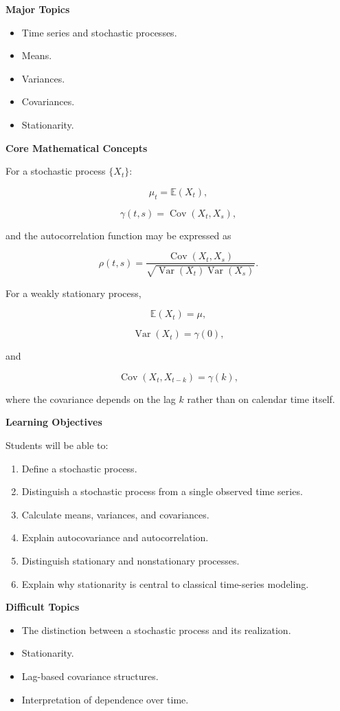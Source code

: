 \documentclass[11pt,a4paper]{article}
\newcommand{\E}{\mathbb{E}}
\newcommand{\Var}{\operatorname{Var}}
\newcommand{\Cov}{\operatorname{Cov}}
\begin{document}
\textbf{Major Topics}

\begin{itemize}
    \item Time series and stochastic processes.
    \item Means.
    \item Variances.
    \item Covariances.
    \item Stationarity.
\end{itemize}

\textbf{Core Mathematical Concepts}

For a stochastic process $\{X_t\}$:

\[
\mu_t = \E(X_t),
\]

\[
\gamma(t,s)
=
\Cov(X_t,X_s),
\]

and the autocorrelation function may be expressed as

\[
\rho(t,s)
=
\frac{\Cov(X_t,X_s)}
{\sqrt{\Var(X_t)\Var(X_s)}}.
\]

For a weakly stationary process,

\[
\E(X_t)=\mu,
\]

\[
\Var(X_t)=\gamma(0),
\]

and

\[
\Cov(X_t,X_{t-k})=\gamma(k),
\]

where the covariance depends on the lag $k$ rather than on calendar time
itself.

\textbf{Learning Objectives}

Students will be able to:

\begin{enumerate}
    \item Define a stochastic process.
    \item Distinguish a stochastic process from a single observed time series.
    \item Calculate means, variances, and covariances.
    \item Explain autocovariance and autocorrelation.
    \item Distinguish stationary and nonstationary processes.
    \item Explain why stationarity is central to classical time-series modeling.
\end{enumerate}

\textbf{Difficult Topics}

\begin{itemize}
    \item The distinction between a stochastic process and its realization.
    \item Stationarity.
    \item Lag-based covariance structures.
    \item Interpretation of dependence over time.
\end{itemize}
\end{document}

